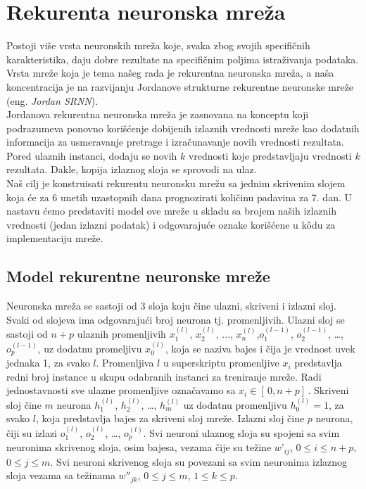 \documentclass[a4paper]{article}
\begin{document}
\section{Rekurenta neuronska mreža}
\label{sec:model}

Postoji više vrsta neuronskih mreža koje, svaka zbog svojih specifičnih karakteristika, daju dobre rezultate na specifičnim poljima istraživanja podataka. Vrsta mreže koja je tema našeg rada je rekurentna neuronska mreža, a naša koncentracija je na razvijanju Jordanove strukturne rekurentne neuronske mreže (eng. \textit{Jordan SRNN}).\\
\indent Jordanova rekurentna neuronska mreža je zasnovana na konceptu koji podrazumeva ponovno korišćenje dobijenih izlaznih vrednosti mreže kao dodatnih informacija za usmeravanje pretrage i izračunavanje novih vrednosti rezultata. Pored ulaznih instanci, dodaju se novih $k$ vrednosti koje predstavljaju vrednosti $k$ rezultata. Dakle, kopija izlaznog sloja se sprovodi na ulaz.\\
\indent Naš cilj je konstruisati rekurentu neuronsku mrežu sa jednim skrivenim slojem koja će za 6 unetih uzastopnih dana prognozirati količinu padavina za 7. dan. U nastavu ćemo predstaviti model ove mreže u skladu sa brojem naših izlaznih vrednosti (jedan izlazni podatak) i odgovarajuće oznake korišćene u k\^{o}du za implementaciju mreže.

\subsection{Model rekurentne neuronske mreže}
\label{sec:model}

Neuronska mreža se sastoji od 3 sloja koju čine ulazni, skriveni i izlazni sloj. Svaki od slojeva ima odgovarajući broj neurona tj. promenljivih.
Ulazni sloj se sastoji od $n+p$ ulaznih promenljivih $x^{(l)}_1$, $x^{(l)}_2$, ..., $x^{(l)}_n$,$o^{(l-1)}_1$, $o^{(l-1)}_2$, …, $o^{(l-1)}_p$,  uz dodatnu promeljivu $x^{(l)}_0$, koja se naziva bajes i čija je vrednost uvek jednaka 1, za svako $l$. Promenljiva $l$ u superskriptu promenljive $x_i$ predstavlja redni broj instance u skupu odabranih instanci za treniranje mreže. Radi jednostavnosti sve ulazne promenljive označavamo sa $x_i {}\in{}[ \,0,n+p ] \,$. Skriveni sloj čine $m$ neurona $h^{(l)}_1$, $h^{(l)}_2$, …, $h^{(l)}_m$ uz dodatnu promenljivu $h^{(l)}_0=1$, za svako $l$, koja predstavlja bajes za skriveni sloj mreže. Izlazni sloj čine $p$ neurona, čiji su izlazi $o^{(l)}_1$, $o^{(l)}_2$, …, $o^{(l)}_p$. Svi neuroni ulaznog sloja su spojeni sa svim neuronima skrivenog sloja, osim bajesa, vezama čije su težine $w’_{ij}$, $0\leq{}i\leq{}n+p$, $0\leq{}j\leq{}m$. Svi neuroni skrivenog sloja su povezani sa svim neuronima izlaznog sloja vezama sa težinama $w{''}_{jk}$, $0\leq{}j\leq{}m$, $1\leq{}k\leq{}p$. 
\end{document}
